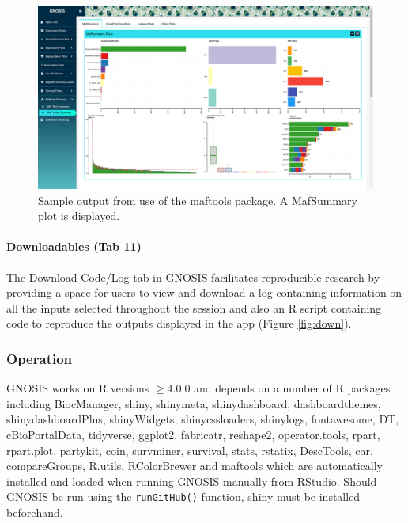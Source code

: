 \begin{figure}[!h]
\center
\includegraphics[width=1\textwidth]{../figures/Chapter_3/GNOSIS_Fig10.png}
\caption[Sample output from use of the maftools package.]{Sample output from use of the maftools package. A MafSummary plot is displayed.}
\label{fig:MAFvis}
\end{figure}

\paragraph{Downloadables (Tab 11)}
\hfill

\noindent The Download Code/Log tab in GNOSIS facilitates reproducible research by providing a space for users to view and download a log containing information on all the inputs selected throughout the session and also an R script containing code to reproduce the outputs displayed in the app (Figure \ref{fig:down}). 

\subsubsection{Operation}
\label{OP}
GNOSIS works on R versions $\geq 4.0.0$ and depends on a number of R packages including BiocManager, shiny, shinymeta, shinydashboard, dashboardthemes, shinydashboardPlus, shinyWidgets, shinycssloaders, shinylogs, fontawesome, DT, cBioPortalData, tidyverse, ggplot2, fabricatr, reshape2, operator.tools, rpart, rpart.plot, partykit, coin, survminer, survival, stats, rstatix, DescTools, car, compareGroups, R.utils, RColorBrewer and maftools \citep{hothorn_hornik_zeileis_2006, reshape2, coin, compareGroups, ctree1, ggplot2, operator.tools, maftools, tidyverse, car, shinycssloaders, cBioPortalData, survminer, shinymeta, shinydashboard, shinydashboardPlus, R.utils, shiny, rpart, fabricatr, shinylogs, rpart.plot, RColorBrewer, dashboardthemes, survival, BiocManager, shinyWidgets, fontawesome, DT, stats, rstatix, DescTools} which are automatically installed and loaded when running GNOSIS manually from RStudio. Should GNOSIS be run using the \texttt{runGitHub()} function, shiny must be installed beforehand. 

